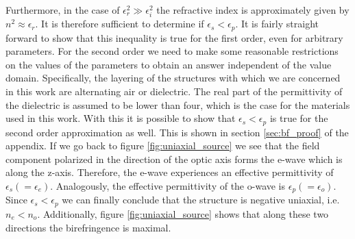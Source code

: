 Furthermore, in the case of $\epsilon_r^2 \gg \epsilon_i^2$ the refractive index is approximately given by $n^2 \approx \epsilon_r$. It is therefore sufficient to determine if $\epsilon_{s} < \epsilon_{p}$. It is fairly straight forward to show that this inequality is true for the first order, even for arbitrary parameters. For the second order we need to make some reasonable restrictions on the values of the parameters to obtain an answer independent of the value domain. Specifically, the layering of the structures with which we are concerned in this work are alternating air or dielectric. The real part of the permittivity of the dielectric is assumed to be lower than four, which is the case for the materials used in this work. With this it is possible to show that $\epsilon_{s} < \epsilon_{p}$ is true for the second order approximation as well. This is shown in section \ref{sec:bf_proof} of the appendix. If we go back to figure \ref{fig:uniaxial_source} we see that the field component polarized in the direction of the optic axis forms the e-wave which is along the z-axis. Therefore, the e-wave experiences an effective permittivity of $\epsilon_{s}(=\epsilon_{e})$. Analogously, the effective permittivity of the o-wave is $\epsilon_{p}(=\epsilon_{o})$. Since $\epsilon_{s} < \epsilon_{p}$ we can finally conclude that the structure is negative uniaxial, i.e. $n_e < n_o$. Additionally, figure \ref{fig:uniaxial_source} shows that along these two directions the birefringence is maximal. 

